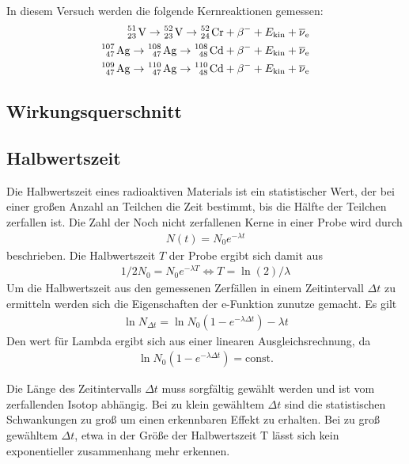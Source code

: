 \noindent
In diesem Versuch werden die folgende Kernreaktionen gemessen:
\begin{align*}
    \ce{^{51}_{23} V} \rightarrow \ce{^{52}_{23} V} \rightarrow \ce{^{52}_{24} Cr}      + \beta^{-} + E_\text{kin} + \overline{\nu}_\text{e}       \\
    \ce{^{107}_{47} Ag} \rightarrow \ce{^{108}_{47} Ag} \rightarrow \ce{^{108}_{48} Cd} + \beta^{-} + E_\text{kin} + \overline{\nu}_\text{e}  \\
    \ce{^{109}_{47} Ag} \rightarrow \ce{^{110}_{47} Ag} \rightarrow \ce{^{110}_{48} Cd} + \beta^{-} + E_\text{kin} + \overline{\nu}_\text{e}  \\
\end{align*}


\subsection{Wirkungsquerschnitt}
\label{sec_}

\subsection{Halbwertszeit}
\label{sec:teo_halbwertszeit}
Die Halbwertszeit eines radioaktiven Materials ist ein statistischer Wert, der bei einer großen Anzahl an Teilchen
die Zeit bestimmt, bis die Hälfte der Teilchen zerfallen ist.
Die Zahl der Noch nicht zerfallenen Kerne in einer Probe wird durch 
\begin{align}
    N(t)= N_0 e^{-\lambda t}
\end{align}
beschrieben.
Die Halbwertszeit $T$ der Probe ergibt sich damit aus
\begin{align}
    1/2 N_0 = N_0 e^{-\lambda T} \Leftrightarrow T = \ln(2)/\lambda
    \label{eq:T_aus_lambda}
\end{align}
Um die Halbwertszeit aus den gemessenen Zerfällen in einem Zeitintervall $\Delta t$
zu ermitteln werden sich die Eigenschaften der e-Funktion zunutze gemacht.
Es gilt
\begin{align}
    \ln N_{\Delta t} = \ln{N_0 (1- e^{-\lambda \Delta t})} - \lambda t
    \label{eq:lambda_aus_N}
\end{align}
Den wert für Lambda ergibt sich aus einer linearen Ausgleichsrechnung, da
\begin{align*}
    \ln{N_0 (1- e^{-\lambda \Delta t})} = \text{const.}
\end{align*}

\noindent
Die Länge des Zeitintervalls $\Delta t$ muss sorgfältig gewählt werden und ist vom
zerfallenden Isotop abhängig.
Bei zu klein gewähltem $\Delta t$ sind die statistischen Schwankungen zu groß um
einen erkennbaren Effekt zu erhalten. 
Bei zu groß gewähltem $\Delta t$, etwa in der Größe der Halbwertszeit T 
lässt sich kein exponentieller zusammenhang mehr erkennen.




